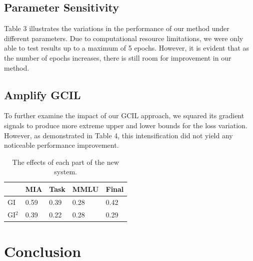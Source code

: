 \documentclass[11pt]{article}
\begin{document}
\subsection{Parameter Sensitivity}  

Table 3 illustrates the variations in the performance of our method under different parameters. Due to computational resource limitations, we were only able to test results up to a maximum of 5 epochs. However, it is evident that as the number of epochs increases, there is still room for improvement in our method.





\subsection{Amplify GCIL} 
To further examine the impact of our GCIL approach, we squared its gradient signals to produce more extreme upper and lower bounds for the loss variation. However, as demonstrated in Table 4, this intensification did not yield any noticeable performance improvement.

\begin{table}[h]\footnotesize
  \centering
    \begin{tabular}{l|l|l|l|l}
    \hline
        ~ & MIA & Task & MMLU & Final \\ \hline
        GI & 0.59 & 0.39 & 0.28 & 0.42 \\ \hline
        GI$^2$ & 0.39 & 0.22 & 0.28 & 0.29 \\ \hline
    \end{tabular}
  \caption{The effects of each part of the new system.}
  \label{tab:accents}
\end{table}





\section{Conclusion} 
%
\end{document}
